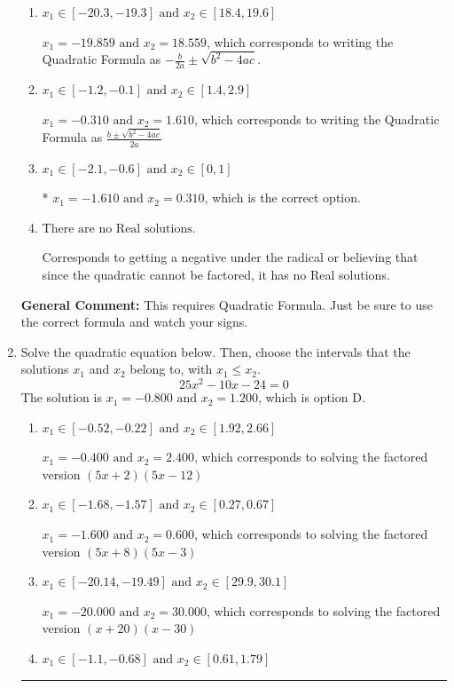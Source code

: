 \documentclass{extbook}[14pt]
\newcommand{\litem}[1]{\item #1

\rule{\textwidth}{0.4pt}}
\begin{document}
\begin{enumerate}
{\begin{enumerate}[label=\Alph*.]
 $x_1 = -3.105 \text{ and } x_2 = 16.105$, which corresponds to using the Quadratic Formula with $a=1$
\item \( x_1 \in [-20.3, -19.3] \text{ and } x_2 \in [18.4, 19.6] \)

 $x_1 = -19.859 \text{ and } x_2 = 18.559$, which corresponds to writing the Quadratic Formula as $-\frac{b}{2a} \pm \sqrt{b^2 - 4ac}$.
\item \( x_1 \in [-1.2, -0.1] \text{ and } x_2 \in [1.4, 2.9] \)

 $x_1 = -0.310 \text{ and } x_2 = 1.610$, which corresponds to writing the Quadratic Formula as $\frac{b \pm \sqrt{b^2 - 4ac}}{2a}$
\item \( x_1 \in [-2.1, -0.6] \text{ and } x_2 \in [0, 1] \)

* $x_1 = -1.610 \text{ and } x_2 = 0.310$, which is the correct option.
\item \( \text{There are no Real solutions.} \)

Corresponds to getting a negative under the radical or believing that since the quadratic cannot be factored, it has no Real solutions.
\end{enumerate}

\textbf{General Comment:} This requires Quadratic Formula. Just be sure to use the correct formula and watch your signs.
}
\litem{
Solve the quadratic equation below. Then, choose the intervals that the solutions $x_1$ and $x_2$ belong to, with $x_1 \leq x_2$.
\[ 25x^{2} -10 x -24 = 0 \]The solution is \( x_1 = -0.800 \text{ and } x_2 = 1.200 \), which is option D.\begin{enumerate}[label=\Alph*.]
\item \( x_1 \in [-0.52, -0.22] \text{ and } x_2 \in [1.92, 2.66] \)

$x_1 = -0.400 \text{ and } x_2 = 2.400$, which corresponds to solving the factored version $(5x + 2)(5x -12)$
\item \( x_1 \in [-1.68, -1.57] \text{ and } x_2 \in [0.27, 0.67] \)

$x_1 = -1.600 \text{ and } x_2 = 0.600$, which corresponds to solving the factored version $(5x + 8)(5x -3)$
\item \( x_1 \in [-20.14, -19.49] \text{ and } x_2 \in [29.9, 30.1] \)

$x_1 = -20.000 \text{ and } x_2 = 30.000$, which corresponds to solving the factored version $(x + 20)(x -30)$
\item \( x_1 \in [-1.1, -0.68] \text{ and } x_2 \in [0.61, 1.79] \)


\end{enumerate}}
\end{enumerate}
\end{document}
